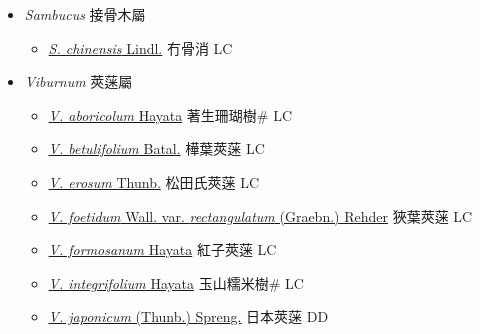 
  \begin{itemize}
 \item[] \textit{Sambucus} 接骨木屬
                    
  \begin{itemize}
        \item[] \href{http://www.theplantlist.org/tpl1.1/search?q=Sambucus+chinensis}{\textit{S. chinensis} Lindl.}   冇骨消 LC
  \end{itemize}
 \item[] \textit{Viburnum} 莢蒾屬
                    
  \begin{itemize}
        \item[] \href{http://www.theplantlist.org/tpl1.1/search?q=Viburnum+aboricolum}{\textit{V. aboricolum} Hayata}   著生珊瑚樹\# LC
        \item[] \href{http://www.theplantlist.org/tpl1.1/search?q=Viburnum+betulifolium}{\textit{V. betulifolium} Batal.}   樺葉莢蒾 LC
        \item[] \href{http://www.theplantlist.org/tpl1.1/search?q=Viburnum+erosum}{\textit{V. erosum} Thunb.}   松田氏莢蒾 LC
        \item[] \href{http://www.theplantlist.org/tpl1.1/search?q=Viburnum+foetidum+var.+rectangulatum}{\textit{V. foetidum} Wall. var. \textit{rectangulatum} (Graebn.) Rehder}   狹葉莢蒾 LC
        \item[] \href{http://www.theplantlist.org/tpl1.1/search?q=Viburnum+formosanum}{\textit{V. formosanum} Hayata}   紅子莢蒾 LC
        \item[] \href{http://www.theplantlist.org/tpl1.1/search?q=Viburnum+integrifolium}{\textit{V. integrifolium} Hayata}   玉山糯米樹\# LC
        \item[] \href{http://www.theplantlist.org/tpl1.1/search?q=Viburnum+japonicum}{\textit{V. japonicum} (Thunb.) Spreng.}   日本莢蒾 DD

\end{itemize}
\end{itemize}

